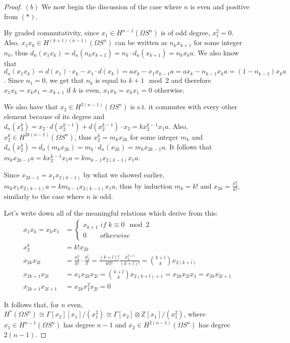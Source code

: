 \documentclass{article}
\newcommand{\numberset}{\mathbb}
\newcommand{\Z}{\numberset{Z}}
\begin{document}
\begin{proof}
    $(b)$ We now begin the discussion of the case where $n$ is even and
    positive from $(*)$.

    By graded commutativity, since $x_1\in H^{n-1}(\Omega S^n)$ is of odd
    degree, $x_1^2=0$. Also, $x_1x_k\in H^{(k+1)(n-1)}(\Omega S^n)$ can be
    written as $n_kx_{k+1}$ for some integer $n_k$, thus
    $d_n(x_1x_k)=d_n(n_kx_{k+1})=n_k\cdot d_n(x_{k+1})=n_kx_ka$. We also
    know that $d_n(x_1x_k)=d(x_1)\cdot x_k-x_1\cdot
    d(x_k)=ax_k-x_1x_{k-1}a=ax_k-n_{k-1}x_k a=(1-n_{k-1})x_ka$. Since
    $n_1=0$, we get that $n_k$ is equal to $k+1\mod 2$ and therefore
    $x_1x_k=x_kx_1=x_{k+1}$ if $k$ is even, $x_1x_k=x_kx_1=0$ otherwise.

    We also have that $x_2\in H^{2(n-1)}(\Omega S^n)$ is s.t. it commutes with
    every other element because of its degree and $d_n(x_2^k)=x_2\cdot
    d(x_2^{k-1})+d(x_2^{k-1})\cdot x_2=kx_2^{k-1}x_1a$. Also, $x_2^k\in
    H^{2k(n-1)}(\Omega S^n)$, thus $x_2^k=m_kx_{2k}$ for some integer $m_k$ and
    $d_n(x_2^k)=d_n(m_kx_{2k})=m_k\cdot d_n(x_{2k})=m_kx_{2k-1}a$. It follows
    that $m_kx_{2k-1}a=kx_2^{k-1}x_1a=km_{k-1}x_{2(k-1)}x_1a$.

    Since $x_{2k-1}=x_1x_{2(k-1)}$ by what we showed earlier,
    $m_kx_1x_{2(k-1)}a=km_{k-1}x_{2(k-1)}x_1a$, thus by induction $m_k=k!$ and
    $x_{2k}=\frac{x_2^k}{k!}$, similarly to the case where $n$ is odd.

    Let's write down all of the meaningful relations which derive from this:
    \begin{align*}
        x_1x_k=x_kx_1 &=\begin{cases}
            x_{k+1}\textit{ if }k\equiv 0\mod 2 \\
            0\quad\quad\textit{otherwise}
        \end{cases} \\
        x_2^k &=k!x_{2k} \\
        x_{2k}x_{2l} &=\frac{x_2^k}{k!}\cdot\frac{x_2^l}{l!}=\frac{(k+l)!}{k!l!}
        \frac{x_2^{k+l}}{(k+l)!}=\binom{k+l}{k}x_{2(k+l)} \\
        x_{2k+1}x_{2l} &=x_1x_{2k}x_{2l}=\binom{k+l}{k}x_{2(k+l)+1}=
        x_{2k}x_{2l}x_1=x_{2k}x_{2l+1} \\
        x_{2k+1}x_{2l+1} &=x_{2k}x_1^2x_{2l}=0
    \end{align*}
    
    It follows that, for $n$ even, $H^*(\Omega S^n)\cong\Gamma[x_2][x_1]/(x_1^2)
    \cong\Gamma[x_2]\otimes\Z[x_1]/(x_1^2)$, where $x_1\in H^{n-1}(\Omega S^n)$
    has degree $n-1$ and $x_2\in H^{2(n-1)}(\Omega S^n)$ has degree $2(n-1)$.
\end{proof}

\printbibliography
\end{document}

